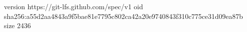 version https://git-lfs.github.com/spec/v1
oid sha256:a55d2aa4843a9f5bae81e7795c802ca42a20e9740843f310c775ce31d09ea87b
size 2436
